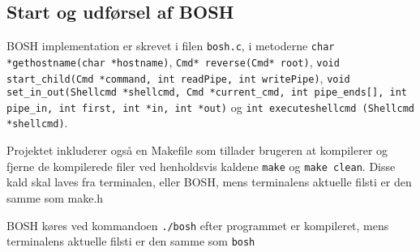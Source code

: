 \subsection{Start og udførsel af BOSH}
BOSH implementation er skrevet i filen \verb+bosh.c+, i metoderne \verb+char *gethostname(char *hostname)+, \verb+Cmd* reverse(Cmd* root)+, \verb+void start_child(Cmd *command, int readPipe, int writePipe)+, \verb+void set_in_out(Shellcmd *shellcmd, Cmd *current_cmd, int pipe_ends[], int pipe_in, int first, int *in, int *out)+ og \verb+int executeshellcmd (Shellcmd *shellcmd)+. 

Projektet inkluderer også en Makefile som tillader brugeren at kompilerer og fjerne de kompilerede filer ved henholdsvis kaldene \verb+make+ og \verb+make clean+. Disse kald skal laves fra terminalen, eller BOSH, mens terminalens aktuelle filsti er den samme som make.h

BOSH køres ved kommandoen \verb+./bosh+ efter programmet er kompileret, mens terminalens aktuelle filsti er den samme som \verb+bosh+